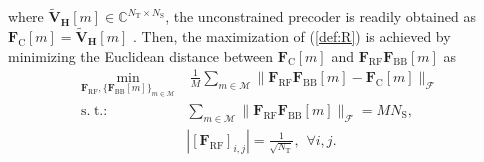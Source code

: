 \documentclass[journal,10pt]{IEEEtran}
\DeclareMathOperator*{\minimize}{min} %
\DeclareMathOperator*{\subjectto}{s.\hspace{3pt} t.:\hspace{3pt}} %
\begin{document}
{		where $\widetilde{\mathbf{V}}_{\mathbf{H}} [m]\in \mathbb{C}^{N_\mathrm{T}\times N_\mathrm{S}}$, the unconstrained precoder is readily obtained as $\mathbf{F}_{\mathrm{C}} [m] = \widetilde{\mathbf{V}}_{\mathbf{H}} [m]$ \cite{heath2016overview}. Then, the maximization of (\ref{def:R}) is achieved by minimizing the Euclidean distance between $\mathbf{F}_\mathrm{C} [m]$ and $\mathbf{F}_\mathrm{RF}\mathbf{F}_\mathrm{BB} [m] $ as
		\begin{align}
		\label{problemCom1}
		\minimize_{\mathbf{F}_\mathrm{RF},\{\mathbf{F}_\mathrm{BB}[m]\}_{m \in \mathcal{M}}}  &\hspace{3pt} \frac{1}{M}\sum_{m \in \mathcal{M}}\|\mathbf{F}_\mathrm{RF}\mathbf{F}_\mathrm{BB}[m]  -  \mathbf{F}_\mathrm{C}[m]\|_\mathcal{F} \nonumber \\
		\subjectto & \sum_{m \in \mathcal{M}}\| \mathbf{F}_\mathrm{RF}\mathbf{F}_\mathrm{BB}[m] \|_\mathcal{F} = MN_\mathrm{S}, \nonumber \\
		& |[\mathbf{F}_\mathrm{RF}]_{i,j}| = \frac{1}{\sqrt{N_\mathrm{T}}}, \hspace{5pt} \forall i,j.
		\end{align}
	}
	
	
\end{document}
